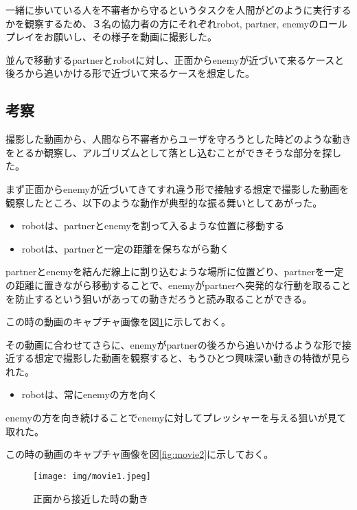 \documentclass{kuisthesis}
\begin{document}
一緒に歩いている人を不審者から守るというタスクを人間がどのように実行するかを観察するため、３名の協力者の方にそれぞれrobot, partner, enemyのロールプレイをお願いし、その様子を動画に撮影した。

並んで移動するpartnerとrobotに対し、正面からenemyが近づいて来るケースと後ろから追いかける形で近づいて来るケースを想定した。

\subsection{考察}
撮影した動画から、人間なら不審者からユーザを守ろうとした時どのような動きをとるか観察し、アルゴリズムとして落とし込むことができそうな部分を探した。

まず正面からenemyが近づいてきてすれ違う形で接触する想定で撮影した動画を観察したところ、以下のような動作が典型的な振る舞いとしてあがった。

\begin{itemize}
\item robotは、partnerとenemyを割って入るような位置に移動する
\item robotは、partnerと一定の距離を保ちながら動く
\end{itemize}

partnerとenemyを結んだ線上に割り込むような場所に位置どり、partnerを一定の距離に置きながら移動することで、enemyがpartnerへ突発的な行動を取ることを防止するという狙いがあっての動きだろうと読み取ることができる。

この時の動画のキャプチャ画像を図\ref{fig:movie1}に示しておく。

その動画に合わせてさらに、enemyがpartnerの後ろから追いかけるような形で接近する想定で撮影した動画を観察すると、もうひとつ興味深い動きの特徴が見られた。

\begin{itemize}
\item robotは、常にenemyの方を向く
\end{itemize}

enemyの方を向き続けることでenemyに対してプレッシャーを与える狙いが見て取れた。

この時の動画のキャプチャ画像を図\ref{fig:movie2}に示しておく。


\begin{figure}[p]\begin{center}
	\texttt{[image: img/movie1.jpeg]}
	\caption{正面から接近した時の動き}
	\label{fig:movie1}
\end{center}\end{figure}
\end{document}
